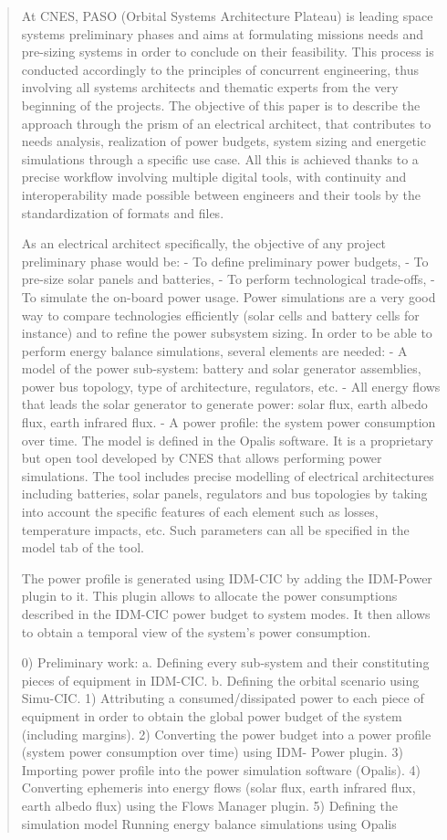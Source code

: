 \begin{quote}
At CNES, PASO (Orbital Systems Architecture
Plateau) is leading space systems preliminary
phases and aims at formulating missions needs
and pre-sizing systems in order to conclude on
their feasibility. This process is conducted
accordingly to the principles of concurrent
engineering, thus involving all systems
architects and thematic experts from the very
beginning of the projects.
The objective of this paper is to describe the
approach through the prism of an electrical
architect, that contributes to needs analysis,
realization of power budgets, system sizing and
energetic simulations through a specific use
case. All this is achieved thanks to a precise
workflow involving multiple digital tools, with
continuity and interoperability made possible
between engineers and their tools by the
standardization of formats and files.

As an electrical architect specifically, the
objective of any project preliminary phase
would be:
- To define preliminary power budgets,
- To pre-size solar panels and batteries,
- To perform technological trade-offs,
- To simulate the on-board power usage.
Power simulations are a very good way to
compare technologies efficiently (solar cells
and battery cells for instance) and to refine the
power subsystem sizing. In order to be able to
perform energy balance simulations, several
elements are needed:
- A model of the power sub-system:
battery and solar generator assemblies,
power bus topology, type of
architecture, regulators, etc.
- All energy flows that leads the solar
generator to generate power: solar flux,
earth albedo flux, earth infrared flux.
- A power profile: the system power
consumption over time.
The model is defined in the Opalis software. It
is a proprietary but open tool developed by
CNES that allows performing power
simulations. The tool includes precise
modelling of electrical architectures including
batteries, solar panels, regulators and bus
topologies by taking into account the specific
features of each element such as losses,
temperature impacts, etc. Such parameters can
all be specified in the model tab of the tool.

The power profile is generated using IDM-CIC
by adding the IDM-Power plugin to it. This
plugin allows to allocate the power
consumptions described in the IDM-CIC power
budget to system modes. It then allows to obtain
a temporal view of the system’s power
consumption.

0) Preliminary work:
a. Defining every sub-system and
their constituting pieces of
equipment in IDM-CIC.
b. Defining the orbital scenario
using Simu-CIC.
1) Attributing a consumed/dissipated
power to each piece of equipment in
order to obtain the global power budget
of the system (including margins).
2) Converting the power budget into a
power profile (system power
consumption over time) using IDM-
Power plugin.
3) Importing power profile into the power
simulation software (Opalis).
4) Converting ephemeris into energy flows
(solar flux, earth infrared flux, earth
albedo flux) using the Flows Manager
plugin.
5) Defining the simulation model
Running energy balance simulations
using Opalis
\cite{review-0289}
\end{quote}

